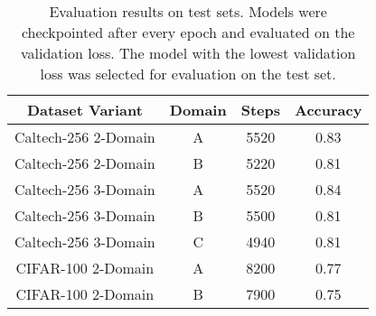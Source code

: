 \begin{table}[ht]
\centering
\caption{Evaluation results on test sets. Models were checkpointed after every epoch and evaluated on the validation loss. The model with the lowest validation loss was selected for evaluation on the test set.}
\label{tab:evaluation_results}
\begin{tabular}{cccc}
\toprule
Dataset Variant & Domain & Steps & Accuracy \\
\midrule
Caltech-256 2-Domain & A & 5520 & 0.83 \\
Caltech-256 2-Domain & B & 5220 & 0.81 \\
Caltech-256 3-Domain & A & 5520 & 0.84 \\
Caltech-256 3-Domain & B & 5500 & 0.81 \\
Caltech-256 3-Domain & C & 4940 & 0.81 \\
CIFAR-100 2-Domain & A & 8200 & 0.77 \\
CIFAR-100 2-Domain & B & 7900 & 0.75 \\
\bottomrule
\end{tabular}
\end{table}

